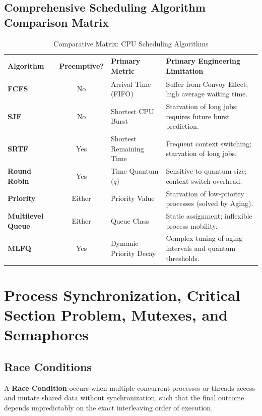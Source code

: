 \subsection{Comprehensive Scheduling Algorithm Comparison Matrix}
\begin{table}[htbp]
\centering
\small
\caption{Comparative Matrix: CPU Scheduling Algorithms}
\label{tab:cpu_scheduling_comparison}
\begin{tabularx}{\textwidth}{l c l X}
\toprule
\textbf{Algorithm} & \textbf{Preemptive?} & \textbf{Primary Metric} & \textbf{Primary Engineering Limitation} \\
\midrule
\textbf{FCFS} & No & Arrival Time (FIFO) & Suffer from Convoy Effect; high average waiting time. \\
\textbf{SJF} & No & Shortest CPU Burst & Starvation of long jobs; requires future burst prediction. \\
\textbf{SRTF} & Yes & Shortest Remaining Time & Frequent context switching; starvation of long jobs. \\
\textbf{Round Robin} & Yes & Time Quantum ($q$) & Sensitive to quantum size; context switch overhead. \\
\textbf{Priority} & Either & Priority Value & Starvation of low-priority processes (solved by Aging). \\
\textbf{Multilevel Queue} & Either & Queue Class & Static assignment; inflexible process mobility. \\
\textbf{MLFQ} & Yes & Dynamic Priority Decay & Complex tuning of aging intervals and quantum thresholds. \\
\bottomrule
\end{tabularx}
\end{table}

\section{Process Synchronization, Critical Section Problem, Mutexes, and Semaphores}
\label{sec:os_synchronization}

\subsection{Race Conditions}
A \textbf{Race Condition} occurs when multiple concurrent processes or threads access and mutate shared data without synchronization, such that the final outcome depends unpredictably on the exact interleaving order of execution.

